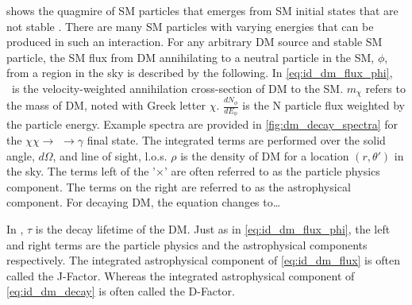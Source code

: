  shows the quagmire of SM particles that emerges from SM initial states that are not stable \cite{2021ICRC:glory_duck}.
There are many SM particles with varying energies that can be produced in such an interaction.
For any arbitrary DM source and stable SM particle, the SM flux from DM annihilating to a neutral particle in the SM, $\phi$, from a region in the sky is described by the following.
\iddmannilationPhi
In \cref{eq:id_dm_flux_phi}, \sv~is the velocity-weighted annihilation cross-section of DM to the SM.
$m_\chi$ refers to the mass of DM, noted with Greek letter $\chi$.
$\frac{dN_{\phi}}{dE_\phi}$ is the N particle flux weighted by the particle energy.
Example spectra are provided in \cref{fig:dm_decay_spectra} for the $\chi\chi \rightarrow$  $\rightarrow \gamma$ final state.
The integrated terms are performed over the solid angle, $d\Omega$, and line of sight, l.o.s.
$\rho$ is the density of DM for a location $(r, \theta')$ in the sky.
The terms left of the '$\times$' are often referred to as the particle physics component.
The terms on the right are referred to as the astrophysical component.
For decaying DM, the equation changes to\dots
\iddmdecay

In , $\tau$ is the decay lifetime of the DM.
Just as in \cref{eq:id_dm_flux_phi}, the left and right terms are the particle physics and the astrophysical components respectively.
The integrated astrophysical component of \cref{eq:id_dm_flux} is often called the J-Factor.
Whereas the integrated astrophysical component of \cref{eq:id_dm_decay} is often called the D-Factor.

\begin{figure}[h]
\end{figure}

